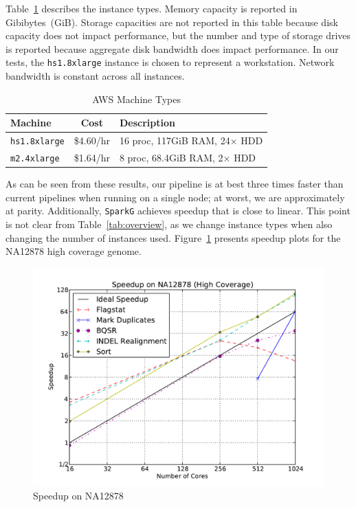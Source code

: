 \documentclass{acm_proc_article-sp}
\begin{document}
Table~\ref{tab:machines} describes the instance types. Memory capacity is reported in Gibibytes~(GiB).
Storage capacities are not reported in this table because disk
capacity does not impact performance, but the number and type of storage drives is reported because
aggregate disk bandwidth does impact performance. In our tests, the \texttt{hs1.8xlarge} instance is
chosen to represent a workstation. Network bandwidth is constant across all instances.

\begin{table}[h]
\caption{AWS Machine Types}
\label{tab:machines}
\begin{center}
\begin{tabular}{ l c l }
\hline
\bf Machine & \bf Cost & \bf Description \\
\hline
\hline
\texttt{hs1.8xlarge} & \$4.60/hr & 16 proc, 117GiB RAM, 24$\times$ HDD \\
\texttt{m2.4xlarge} & \$1.64/hr & 8 proc, 68.4GiB RAM, 2$\times$ HDD \\
\hline
\end{tabular}
\end{center}
\end{table}

As can be seen from these results, our pipeline is at best three times faster than current pipelines when running
on a single node; at worst, we are approximately at parity. Additionally, \texttt{SparkG} achieves speedup that is
close to linear. This point is not clear from Table~\ref{tab:overview}, as we change instance types when also
changing the number of instances used. Figure~\ref{fig:speedup} presents speedup plots for the NA12878 high
coverage genome.

\begin{figure}[h]
\begin{center}
\includegraphics[width=0.99\linewidth]{graphs/speedup_na12878.pdf}
\end{center}
\caption{Speedup on NA12878}
\label{fig:speedup}
\end{figure}
\end{document}
